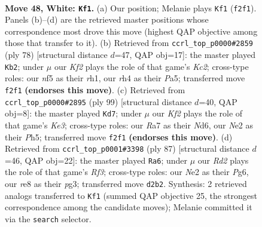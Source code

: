 \documentclass[11pt]{article}
\begin{document}
\clearpage

\begin{figure}[p]\centering
\begin{subfigure}{0.46\textwidth}\centering
\resizebox{\linewidth}{!}{%
\newchessgame
\chessboard[
  setfen={4r3/R7/3pk1p1/5n1p/7r/1p6/3RNKP1/8 w - - 2 48},
  showmover=false,
  pgfstyle=straightmove, color=movearrow, markmove={f2-f1}
]}
\caption{}
\end{subfigure}\hfill
\begin{subfigure}{0.46\textwidth}\centering
\resizebox{\linewidth}{!}{%
\newchessgame
\chessboard[
  setfen={8/5pk1/2p1n3/P7/1PR4p/2N2P2/2K5/7r w - - 0 40},
  showmover=false,
  pgfstyle=straightmove, color=movearrow, markmove={c2-b2}
]}
\caption{}
\end{subfigure}
\\[4pt]
\begin{subfigure}{0.46\textwidth}\centering
\resizebox{\linewidth}{!}{%
\newchessgame
\chessboard[
  setfen={8/4p3/3nk1p1/r6p/PR1K4/2N4P/6P1/8 b - - 21 50},
  showmover=false,
  pgfstyle=straightmove, color=movearrow, markmove={e6-d7}
]}
\caption{}
\end{subfigure}\hfill
\begin{subfigure}{0.46\textwidth}\centering
\resizebox{\linewidth}{!}{%
\newchessgame
\chessboard[
  setfen={2r3k1/7p/5rp1/3P4/8/4N1PP/1R3P2/6K1 b - - 3 44},
  showmover=false,
  pgfstyle=straightmove, color=movearrow, markmove={f6-a6}
]}
\caption{}
\end{subfigure}
\caption{\textbf{Move 48, White: \texttt{Kf1}.} (a) Our position; Melanie plays \texttt{Kf1} (\texttt{f2f1}). Panels (b)--(d) are the retrieved master positions whose correspondence most drove this move (highest QAP objective among those that transfer to it). (b) Retrieved from \texttt{ccrl\_top\_p0000\#2859} (ply 78) [structural distance $d$=47, QAP obj=17]: the master played \texttt{Kb2}; under $\mu$ our \emph{Kf2} plays the role of that game's \emph{Kc2}; cross-type roles: our \emph{n}f5 as their \emph{r}h1, our \emph{r}h4 as their \emph{P}a5; transferred move \texttt{f2f1} \textbf{(endorses this move)}. (c) Retrieved from \texttt{ccrl\_top\_p0000\#2895} (ply 99) [structural distance $d$=40, QAP obj=8]: the master played \texttt{Kd7}; under $\mu$ our \emph{Kf2} plays the role of that game's \emph{Ke3}; cross-type roles: our \emph{R}a7 as their \emph{N}d6, our \emph{N}e2 as their \emph{P}h5; transferred move \texttt{f2f1} \textbf{(endorses this move)}. (d) Retrieved from \texttt{ccrl\_top\_p0001\#3398} (ply 87) [structural distance $d$=46, QAP obj=22]: the master played \texttt{Ra6}; under $\mu$ our \emph{Rd2} plays the role of that game's \emph{Rf3}; cross-type roles: our \emph{N}e2 as their \emph{P}g6, our \emph{r}e8 as their \emph{p}g3; transferred move \texttt{d2b2}. Synthesis: 2 retrieved analogs transferred to \texttt{Kf1} (summed QAP objective 25, the strongest correspondence among the candidate moves); Melanie committed it via the \texttt{search} selector.}
\label{fig:thought-m94}
\end{figure}
\end{document}
